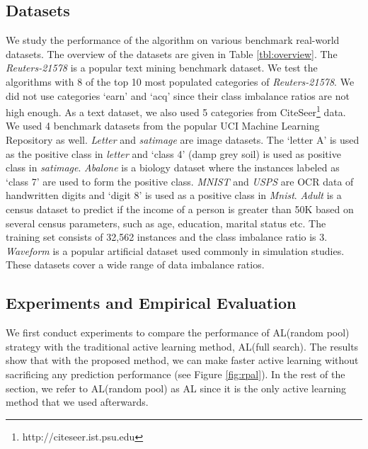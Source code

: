 \subsection{Datasets}
We study the performance of the algorithm on various benchmark real-world datasets. The overview of the datasets are given in Table \ref{tbl:overview}. The \emph{Reuters-21578} is a popular text mining benchmark dataset. We test the algorithms with 8 of the top 10 most populated categories of \emph{Reuters-21578}. We did not use categories `earn' and `acq' since their class imbalance ratios are not high enough. As a text dataset, we also used 5 categories from CiteSeer\footnote{http://citeseer.ist.psu.edu} data. We used 4 benchmark datasets from the popular UCI Machine Learning Repository as well. \emph{Letter} and \emph{satimage} are image datasets. The `letter A' is used as the positive class in \emph{letter} and `class 4' (damp grey soil) is used as positive class in \emph{satimage}. \emph{Abalone} is a biology dataset where the instances labeled as `class 7' are used to form the positive class. \emph{MNIST} and \emph{USPS} are OCR data of handwritten digits and `digit 8' is used as a positive class in \emph{Mnist}. \emph{Adult} is a census dataset to predict if the income of a person is greater than 50K based on several census parameters, such as age, education, marital status etc. The training set consists of 32,562 instances and the class imbalance ratio is 3. \emph{Waveform} is a popular artificial dataset used commonly in simulation studies. These datasets cover a wide range of data imbalance ratios.

\subsection{Experiments and Empirical Evaluation}
\label{lotb_experiments}
We first conduct experiments to compare the performance of AL(random pool) strategy with the traditional active learning method, AL(full search). The results show that with the proposed method, we can make faster active learning without sacrificing any prediction performance (see Figure \ref{fig:rpal}). In the rest of the section, we refer to AL(random pool) as AL since it is the only active learning method that we used afterwards.

